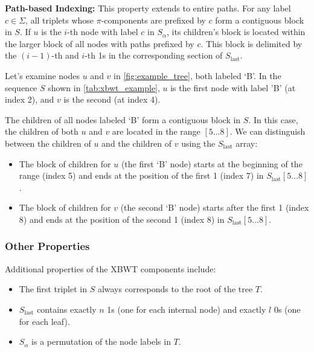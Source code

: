 \textbf{Path-based Indexing:} This property extends to entire paths. For any label $c \in \Sigma$, all triplets whose $\pi$-components are prefixed by $c$ form a contiguous block in $S$. If $u$ is the $i$-th node with label $c$ in $S_{\alpha}$, its children's block is located within the larger block of all nodes with paths prefixed by $c$. This block is delimited by the $(i-1)$-th and $i$-th 1s in the corresponding section of $S_{\text{last}}$. \label{prop3}
\begin{example}
    Let's examine nodes $u$ and $v$ in \cref{fig:example_tree}, both labeled `B'. In the sequence $S$ shown in \cref{tab:xbwt_example}, $u$ is the first node with label 'B' (at index 2), and $v$ is the second (at index 4).

    The children of all nodes labeled `B' form a contiguous block in $S$. In this case, the children of both $u$ and $v$ are located in the range $[5 \dots 8]$. We can distinguish between the children of $u$ and the children of $v$ using the $S_{\text{last}}$ array:
    \begin{itemize}
        \item The block of children for $u$ (the first `B' node) starts at the beginning of the range (index 5) and ends at the position of the first 1 (index 7) in $S_{\text{last}}[5 \dots 8]$.
        \item The block of children for $v$ (the second `B' node) starts after the first 1 (index 8) and ends at the position of the second 1 (index 8) in $S_{\text{last}}[5 \dots 8]$.
    \end{itemize}
\end{example}

\subsubsection{Other Properties}
Additional properties of the XBWT components include:

\begin{itemize}
    \item The first triplet in $S$ always corresponds to the root of the tree $T$.
    \item $S_{\text{last}}$ contains exactly $n$ 1s (one for each internal node) and exactly $l$ 0s (one for each leaf).
    \item $S_{\alpha}$ is a permutation of the node labels in $T$.
\end{itemize}

